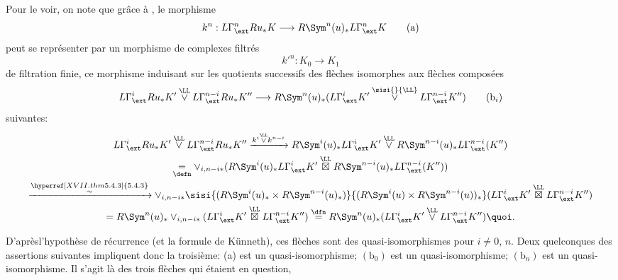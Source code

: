 Pour le voir, on note que grâce à , le morphisme
\begin{equation*}
k^{n}:L\Gamma^{n}_{\ext}Ru_{\ast}K\longrightarrow R\Sym^{n}(u)_{\ast}L\Gamma^{n}_{\ext}K\tag{a}
\end{equation*}
peut se représenter par un morphisme de complexes filtrés
$$
{k'}^{n}:K_{0}\longrightarrow K_{1}
$$
de filtration finie, ce morphisme induisant sur les quotients
successifs des flèches isomorphes aux flèches composées
\begin{equation*}
L\Gamma^{i}_{\ext}Ru_{\ast}K'\overset{\LL}{\vee}
L\Gamma^{n-i}_{\ext} Ru_{\ast}K''\longrightarrow
R\Sym^{n}(u)_{\ast}(L\Gamma^{i}_{\ext}K'\overset{\sisi{}{\LL}}{\vee}
L\Gamma^{n-i}_{\ext}K'')\tag{$\text{b}_i$}
\end{equation*}
suivantes:
\begin{gather*}
L\Gamma^{i}_{\ext}Ru_{\ast}K'\overset{\LL}{\vee}
L\Gamma^{n-i}_{\ext}Ru_{\ast}K''\xrightarrow{k^{i}\overset{\LL}{\vee}k^{n-i}}
R\Sym^{i}(u)_{\ast}L\Gamma^{i}_{\ext}K'\overset{\LL}{\vee}
R\Sym^{n-i}(u)_{\ast}L\Gamma^{n-i}_{\ext}(K'')\\
\underset{\defn}{=}
\vee_{i,n-i {\ast}}(R\Sym^{i}(u)_{\ast}L\Gamma^{i}_{\ext}K'\overset{\LL}{\boxtimes}
R\Sym^{n-i}(u)_{\ast}L\Gamma^{n-i}_{\ext}(K''))\\
\xrightarrow{\substack{\hyperref[XVII.thm5.4.3]{5.4.3}\\\sim}}\vee_{i,n-i {\ast}}\sisi{(R\Sym^{i}(u)_{\ast}\times R \Sym^{n-i}(u)_{\ast})}{(R\Sym^i(u)\times R\Sym^{n-i}(u))_\ast}
(L\Gamma^{i}_{\ext}K'\overset{\LL}{\boxtimes}
L\Gamma^{n-i}_{\ext}K'')\\
=R\Sym^{n}(u)_{\ast}\vee_{i,n-i{\ast}}(L\Gamma^{i}_{\ext}K'\overset{\LL}{\boxtimes}L\Gamma^{n-i}_{\ext}K'')\overset{\dfn}{=} R\Sym^{n}(u)_{\ast}(L\Gamma^{i}_{\ext}K'\overset{\LL}{\vee}L\Gamma^{n-i}_{\ext}K''){\quoi}.
\end{gather*}

D'après\pageoriginale l'hypothèse de récurrence (et la formule de
Künneth), ces flèches sont des quasi-isomorphismes pour $i\neq 0$,
$n$. Deux quelconques des assertions suivantes impliquent donc la
troisième: (a) est un quasi-isomorphisme; $(\text{b}_0)$ est un
quasi-isomorphisme; $(\text{b}_n)$ est un quasi-isomorphisme. Il s'agit
là des trois flèches qui étaient en question, \cqfd

\setcounter{subsubsection}{22}
\setcounter{paragraph}{2}
